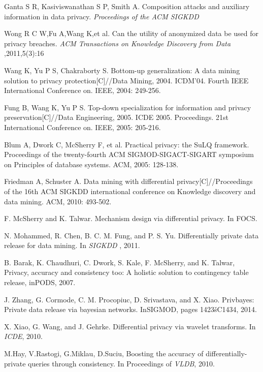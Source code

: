 \begin{thebibliography}{1}
 Ganta S R, Kasiviswanathan S P, Smith A. Composition attacks and auxiliary information in data privacy. {\it Proceedings of the ACM SIGKDD}

 Wong R C W,Fu A,Wang K,et al. Can the utility of anonymized data be used for privacy breaches. {\it ACM Transactions on Knowledge Discovery from Data },2011,5(3):16

Wang K, Yu P S, Chakraborty S. Bottom-up generalization: A data mining solution to privacy protection[C]//Data Mining, 2004. ICDM'04. Fourth IEEE International Conference on. IEEE, 2004: 249-256.

Fung B, Wang K, Yu P S. Top-down specialization for information and privacy preservation[C]//Data Engineering, 2005. ICDE 2005. Proceedings. 21st International Conference on. IEEE, 2005: 205-216.

Blum A, Dwork C, McSherry F, et al. Practical privacy: the SuLQ framework. Proceedings of the twenty-fourth ACM SIGMOD-SIGACT-SIGART symposium on Principles of database systems. ACM, 2005: 128-138.

Friedman A, Schuster A. Data mining with differential privacy[C]//Proceedings of the 16th ACM SIGKDD international conference on Knowledge discovery and data mining. ACM, 2010: 493-502.

F. McSherry and K. Talwar. Mechanism design via differential privacy. In FOCS.

N. Mohammed, R. Chen, B. C. M. Fung, and P. S. Yu. Differentially private data release for data mining. In {\it SIGKDD }, 2011.

B. Barak, K. Chaudhuri, C. Dwork, S. Kale, F. McSherry, and K. Talwar, Privacy, accuracy and consistency too: A holistic solution to contingency table release, inPODS, 2007.

J. Zhang, G. Cormode, C. M. Procopiuc, D. Srivastava, and X. Xiao. Privbayes: Private data
release via bayesian networks. InSIGMOD, pages 1423šC1434, 2014.

 X. Xiao, G. Wang, and J. Gehrke. Differential privacy via wavelet transforms. In {\it ICDE}, 2010.

 M.Hay, V.Rastogi, G.Miklau, D.Suciu, Boosting the accuracy of differentially-private queries through consistency. In Proceedings of {\it VLDB},  2010.


\end{thebibliography}
